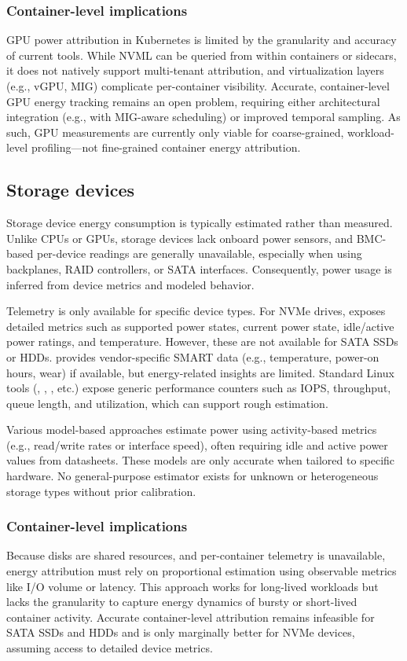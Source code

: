 \subsubsection{Container-level implications}
GPU power attribution in Kubernetes is limited by the granularity and accuracy of current tools. While NVML can be queried from within containers or sidecars, it does not natively support multi-tenant attribution, and virtualization layers (e.g., vGPU, MIG) complicate per-container visibility. Accurate, container-level GPU energy tracking remains an open problem, requiring either architectural integration (e.g., with MIG-aware scheduling) or improved temporal sampling. As such, GPU measurements are currently only viable for coarse-grained, workload-level profiling—not fine-grained container energy attribution.

\subsection{Storage devices}

Storage device energy consumption is typically estimated rather than measured. Unlike CPUs or GPUs, storage devices lack onboard power sensors, and BMC-based per-device readings are generally unavailable, especially when using backplanes, RAID controllers, or SATA interfaces. Consequently, power usage is inferred from device metrics and modeled behavior.

Telemetry is only available for specific device types. For NVMe drives,  exposes detailed metrics such as supported power states, current power state, idle/active power ratings, and temperature. However, these are not available for SATA SSDs or HDDs.  provides vendor-specific SMART data (e.g., temperature, power-on hours, wear) if available, but energy-related insights are limited. Standard Linux tools (, , , etc.) expose generic performance counters such as IOPS, throughput, queue length, and utilization, which can support rough estimation.

Various model-based approaches estimate power using activity-based metrics (e.g., read/write rates or interface speed), often requiring idle and active power values from datasheets. These models are only accurate when tailored to specific hardware. No general-purpose estimator exists for unknown or heterogeneous storage types without prior calibration.

\subsubsection{Container-level implications}
Because disks are shared resources, and per-container telemetry is unavailable, energy attribution must rely on proportional estimation using observable metrics like I/O volume or latency. This approach works for long-lived workloads but lacks the granularity to capture energy dynamics of bursty or short-lived container activity. Accurate container-level attribution remains infeasible for SATA SSDs and HDDs and is only marginally better for NVMe devices, assuming access to detailed device metrics.

